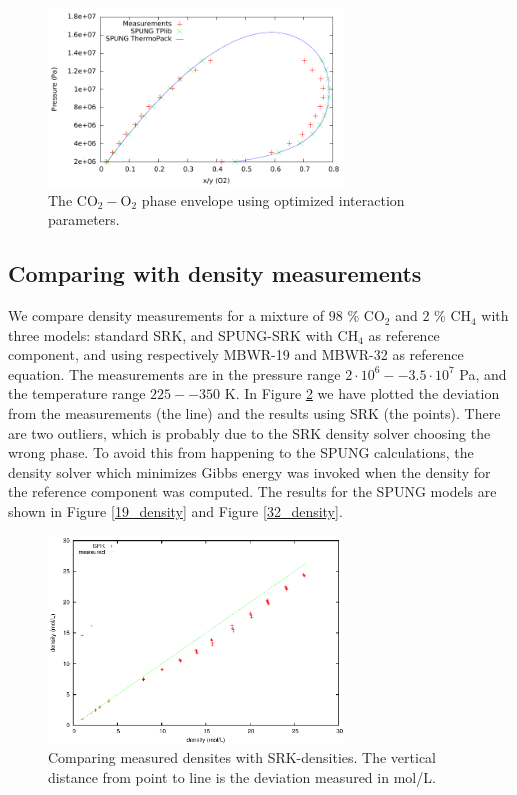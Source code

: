 \documentclass[internal,english]{sintefmemo2012}
\numberwithin{equation}{section}
\begin{document}
\begin{figure}[h]
  \centering
  \includegraphics[width=0.7\textwidth]{figures/phaseEnvelope_O2_optimized.pdf}
  \caption{The $\mathrm{CO}_2-\mathrm O_2$ phase envelope using
    optimized interaction parameters.}
  \label{fig:O2opt}
\end{figure}

\subsection{Comparing with density measurements}
We compare density measurements for a mixture of $98$ \% CO$_2$ and $2$ \% CH$_4$ with three models: standard SRK, and SPUNG-SRK with CH$_4$ as reference component, and using respectively MBWR-19 and MBWR-32 as reference equation. The measurements are in the pressure range $2\cdot 10^6 -- 3.5 \cdot 10^7$ Pa, and the temperature range $225--350$ K. In Figure \ref{SRK_density} we have plotted the deviation from the measurements (the line) and the results using SRK (the points). There are two outliers, which is probably due to the SRK density solver choosing the wrong phase. To avoid this from happening to the SPUNG calculations, the density solver which minimizes Gibbs energy was invoked when the density for the reference component was computed. The results for the SPUNG models are shown in Figure \ref{19_density} and Figure \ref{32_density}.

\begin{figure}[h]
  \centering
  \includegraphics[width=0.7\textwidth]{figures/SRK_density.eps}
  \caption{Comparing measured densites with SRK-densities. The vertical distance from point to line is the deviation measured in mol/L.}
  \label{SRK_density}
\end{figure}
\end{document}
